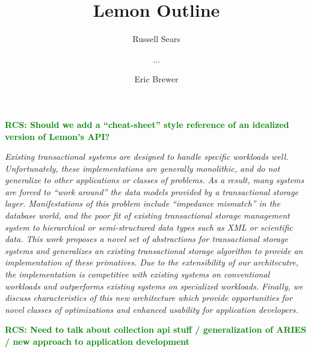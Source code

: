 \documentclass[letterpaper,twocolumn,english]{article}
\newcommand{\yad}{Lemon\xspace}
\newcommand{\rcs}[1]{\textcolor{green}{\bf RCS: #1}}
\begin{document}
\title{\yad Outline }


\author{Russell Sears \and ... \and Eric Brewer}

\maketitle




\rcs{Should we add a
``cheat-sheet'' style reference of an idealized version of \yad's
API?}
\vspace*{6pt}

{\em Existing transactional systems are designed to handle specific
workloads well.  Unfortunately, these implementations are generally
monolithic, and do not generalize to other applications or classes of
problems.  As a result, many systems are forced to ``work around'' the
data models provided by a transactional storage layer. Manifestations
of this problem include ``impedance mismatch'' in the database world,
and the poor fit of existing transactional storage management system
to hierarchical or semi-structured data types such as XML or
scientific data.  This work proposes a novel set of abstractions for
transactional storage systems and generalizes an existing
transactional storage algorithm to provide an implementation of these
primatives.  Due to the extensibility of our architecutre, the
implementation is competitive with existing systems on conventional
workloads and outperforms existing systems on specialized
workloads.  Finally, we discuss characteristics of this new
architecture which provide opportunities for novel classes of
optimizations and enhanced usability for application developers.}

\rcs{Need to talk about collection api stuff / generalization of ARIES
/ new approach to application development}
\end{document}
